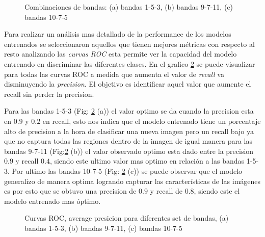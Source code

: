 \begin{figure}[htbp]
\centering
{}
\caption{Combinaciones de bandas: (a) bandas 1-5-3, (b) bandas 9-7-11, (c) bandas 10-7-5} \label{fig:COMB_BANDAS}
\end{figure}

Para realizar un análisis mas detallado de la performance de los modelos entrenados se seleccionaron aquellos que tienen mejores métricas con respecto al resto analizando las \textit{curvas ROC} esta permite ver la capacidad del modelo entrenado en discriminar las diferentes clases. En el grafico \ref{fig:Average_precision} se puede visualizar para todas las curvas ROC a medida que aumenta el valor de \textit{recall} va disminuyendo la \textit{precision}. El objetivo es identificar aquel valor que aumente el recall sin perder la precision.
\newpage

Para las bandas 1-5-3 (Fig: \ref{fig:Average_precision} (a)) el valor optimo se da cuando la precision esta en $0.9$ y $0.2$ en recall, esto nos indica que el modelo entrenado tiene un porcentaje alto de precision a la hora de clasificar una nueva imagen pero un recall bajo ya que no captura todas las regiones dentro de la imagen de igual manera para las bandas 9-7-11 (Fig:\ref{fig:Average_precision} (b)) el valor observado optimo esta dado entre la precision $0.9$ y recall $0.4$, siendo este ultimo valor mas optimo en relación a las bandas 1-5-3. Por ultimo las bandas 10-7-5 (Fig: \ref{fig:Average_precision} (c)) se puede observar que el modelo generalizo de manera optima logrando capturar las características de las imágenes es por esto que se obtuvo una precision de $0.9$ y recall  de $0.8$, siendo este el modelo entrenado mas óptimo. 

\begin{figure}[htbp]
\centering
{}
\caption{Curvas ROC, average presicion para diferentes set de bandas, (a) bandas 1-5-3, (b) bandas 9-7-11, (c) bandas 10-7-5} \label{fig:Average_precision}
\end{figure}
 

